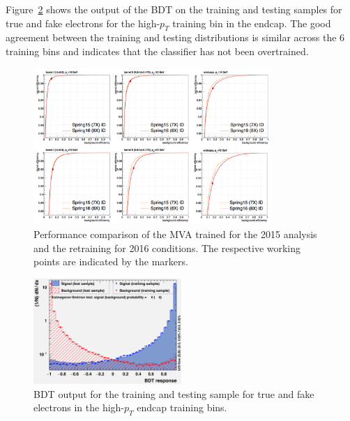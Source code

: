 Figure~\ref{fig:ele_ID_BDT_output} shows the output of the BDT on the training and testing samples for true and fake electrons 
for the high-$p_T$ training bin in the endcap. 
The good agreement between the training and testing distributions is similar across the 6 training bins and indicates that the classifier has not been overtrained.

\begin{figure}[!htb]
\vspace*{0.3cm}
\begin{center}
\includegraphics[width=0.80\textwidth]{Figures/Electrons/ele_ROC.png}
\caption{Performance comparison of the MVA trained for the 2015 analysis and the retraining for 2016 conditions. 
The respective working points are indicated by the markers.
\label{fig:ele_ID_ROC}}
\end{center}
\end{figure}

\begin{figure}[!htb]
\vspace*{0.3cm}
\begin{center}
\includegraphics[width=0.5\textwidth]{Figures/Electrons/ele_overtraining.png}
\caption{BDT output for the training and testing sample for true and fake electrons in the high-$p_T$ endcap training bins.
\label{fig:ele_ID_BDT_output}}
\end{center}
\end{figure}

